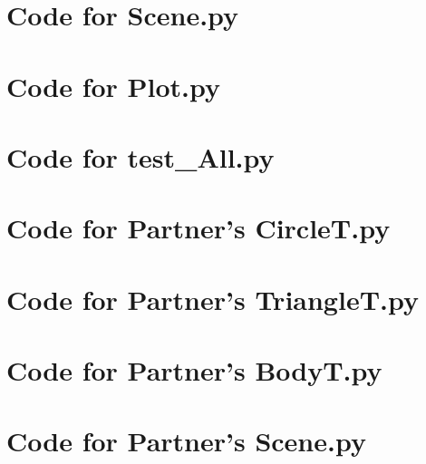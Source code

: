\documentclass[12pt]{article}
\begin{document}
\noindent 

\newpage

\section{Code for Scene.py}

\noindent 

\newpage

\section{Code for Plot.py}

\noindent 

\newpage

\section{Code for test\_All.py}

\noindent 

\newpage

\section{Code for Partner's CircleT.py}

\noindent 

\newpage

\section{Code for Partner's TriangleT.py}

\noindent 

\newpage

\section{Code for Partner's BodyT.py}

\noindent 

\newpage

\section{Code for Partner's Scene.py}

\noindent 

\newpage
\end{document}
